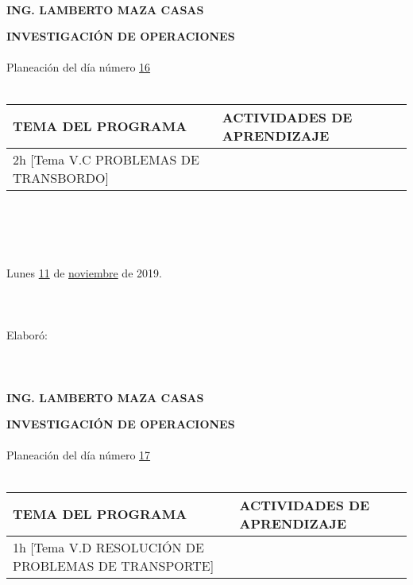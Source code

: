 \documentclass[landscape]{article}
\begin{document}
{\begin{center}
\ \\
{\bf ING. LAMBERTO MAZA CASAS}
\end{center}
\eject
\begin{center}
{\bf 
INVESTIGACI\'ON DE OPERACIONES
}
\ \\
\ \\
Planeaci\'on del d\'ia n\'umero \underline{\hspace{0.5cm}16\hspace{0.5cm}}
\ \\
\ \\
\begin{tabular}{|p{11cm}|p{8cm}|}\hline
{\bf TEMA DEL PROGRAMA}&{\bf ACTIVIDADES DE APRENDIZAJE}\\\hline
	2h	[Tema V.C PROBLEMAS DE TRANSBORDO]
&\\
\hline
\end{tabular}
\ \\
\ \\
\ \\
\ \\
Lunes \underline{\hspace{0.5cm}11\hspace{0.5cm}} de  \underline{\hspace{0.5cm}noviembre\hspace{0.5cm}} de 2019.
\ \\
\ \\
\ \\
\ \\
Elabor\'o:
\ \\
\ \\
\ \\
\ \\
{\bf ING. LAMBERTO MAZA CASAS}
\end{center}
\eject
\begin{center}
{\bf 
INVESTIGACI\'ON DE OPERACIONES
}
\ \\
\ \\
Planeaci\'on del d\'ia n\'umero \underline{\hspace{0.5cm}17\hspace{0.5cm}}
\ \\
\ \\
\begin{tabular}{|p{11cm}|p{8cm}|}\hline
{\bf TEMA DEL PROGRAMA}&{\bf ACTIVIDADES DE APRENDIZAJE}\\\hline
	1h	[Tema V.D RESOLUCI\'ON DE PROBLEMAS DE TRANSPORTE]
&\\
\hline
\end{tabular}
\ \\

\end{center}}
\end{document}
